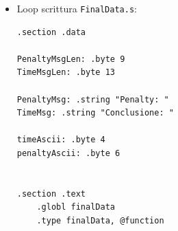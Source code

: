 \documentclass[a4paper]{report}
\begin{document}
\begin{itemize}
\begin{lstlisting}[firstnumber=1]
    movl (%esi, %eax, 1), %ecx
    movl (%esi, %ebx, 1), %edx

    movl %ecx, (%esi, %ebx, 1)
    movl %edx, (%esi, %eax, 1)

    movb $1, flag

    jmp reset

SetDurata:        # se scadenza uguale priorità uguali, controllo la durata

    addl $1, %eax    # incremento così vado da ID a durata
    addl $1, %ebx

Durata:

    movb (%esi, %eax, 1), %cl
    movb (%esi, %ebx, 1), %dl


    subl $1, %eax
    subl $1, %ebx

    cmpb %cl, %dl
    jge reset
    
    movl (%esi, %eax, 1), %ecx
    movl (%esi, %ebx, 1), %edx

    movl %ecx, (%esi, %ebx, 1)
    movl %edx, (%esi, %eax, 1)

    movb $1, flag

reset:

    addb base, %al     # resetto base
    addb base, %bl     # resetto base

next:

    cmpb $1, flag
    je Redo

    addl $4, %eax
    addl $4, %ebx
    jmp loop

Redo:                   # se ho fatto uno swap, ripeto il confronto

    movl $0, flag
    movl base, %ecx
    movl %ecx, %eax
    movl %eax, %ebx
    addl $4, %ebx

    jmp loop

endLoop:
    
    ret
    
    \end{lstlisting}


    
    \item Loop scrittura \texttt{FinalData.s}:
    
    \begin{lstlisting}[firstnumber=1]
.section .data

PenaltyMsgLen: .byte 9
TimeMsgLen: .byte 13

PenaltyMsg: .string "Penalty: "
TimeMsg: .string "Conclusione: "

timeAscii: .byte 4
penaltyAscii: .byte 6


.section .text
    .globl finalData
    .type finalData, @function


\end{lstlisting}
\end{itemize}
\end{document}
